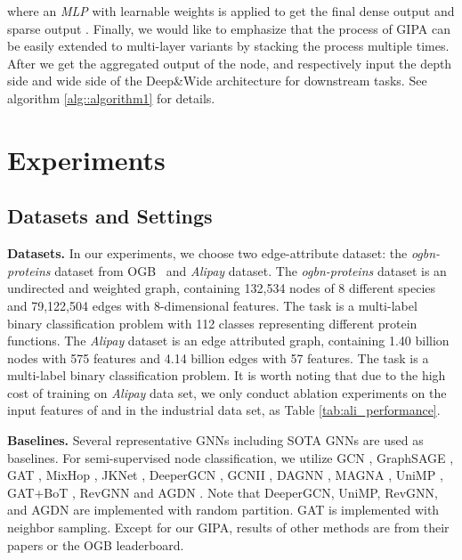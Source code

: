 \documentclass[runningheads]{llncs}
\newcommand{\model}{GIPA\xspace}
\begin{document}
\noindent where an \textit{MLP} with learnable weights  is applied to get the final dense output  and sparse output  . 
Finally, we would like to emphasize that the process of \model can be easily extended to multi-layer variants by stacking the process multiple times. After we get the aggregated output of the node,  and  respectively input the depth side and wide side of the Deep\&Wide architecture for downstream tasks. See algorithm \ref{alg::algorithm1} for details.



\section{Experiments}
\subsection{Datasets and Settings}
\noindent \textbf{Datasets.} In our experiments, we choose two edge-attribute dataset: the \textit{ogbn-proteins} dataset from OGB~\cite{hu2020open} and \textit{Alipay} dataset\cite{graphtheta}. The \textit{ogbn-proteins} dataset is an undirected and weighted graph, containing 132,534 nodes of 8 different species and 79,122,504 edges with 8-dimensional features. The task is a multi-label binary classification problem with 112 classes representing different protein functions. The \textit{Alipay} dataset is an edge attributed graph, containing 1.40 billion nodes with 575 features and 4.14 billion edges with 57 features. The task is a multi-label binary classification problem. It is worth noting that due to the 
high cost of training on \textit{Alipay} data set, we only conduct ablation experiments on the
input features of  and  in the industrial data set, as Table \ref{tab:ali_performance}.

\noindent \textbf{Baselines.} Several representative GNNs including SOTA GNNs are used as baselines. For semi-supervised node classification, we utilize GCN \cite{kipf2016semi}, GraphSAGE \cite{hamilton2017inductive}, GAT \cite{velivckovic2017graph}, MixHop \cite{abu2019mixhop}, JKNet \cite{xu2018representation}, DeeperGCN \cite{li2020deepergcn}, GCNII \cite{chen2020simple}, DAGNN \cite{liu2020towards}, MAGNA \cite{wang2020direct}, UniMP \cite{shi2020masked}, GAT+BoT \cite{wang2021bag}, RevGNN \cite{li2021training} and AGDN \cite{sun2020adaptive}. Note that DeeperGCN, UniMP, RevGNN, and AGDN are implemented with random partition. GAT is implemented with neighbor sampling. Except for our \model, results of other methods are from their papers or the OGB leaderboard.
\end{document}
